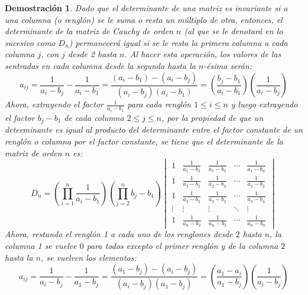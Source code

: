 \documentclass[a4paper,11pt]{article}
\theoremstyle{teoremas}
\theoremstyle{ejemplos}
\theoremstyle{definiciones}
\theoremstyle{lemas}
\newtheorem*{demostracion}{Demostraci\'on}
\begin{document}
\begin{demostracion}
 Dado que el determinante de una matriz es invariante si a una columna (o rengl\'on) se le suma o resta un m\'ultiplo de otra, entonces, el determinante de la matriz de Cauchy de orden $n$ (al que se le denotar\'a en lo sucesivo como $D_n$) permanecer\'a igual si se le resta la primera columna a cada columna $j$, con $j$ desde 2 hasta $n$. Al hacer esta operaci\'on, los valores de las sentradas en cada columna desde la segunda hasta la $n$-\'esima ser\'an:
 \begin{equation*}
  a_{ij} = \frac{1}{a_i-b_j} - \frac{1}{a_i - b_1} = \frac{(a_i - b_1) - (a_i - b_j)}{(a_i - b_j)(a_i - b_1)} = \left( \frac{b_j - b_1}{a_i - b_1} \right) \left( \frac{1}{a_i - b_j} \right)
 \end{equation*}
 Ahora, extrayendo el factor $\frac{1}{a_i - b_1}$ para cada rengl\'on $1\leq i \leq n$ y luego extrayendo el factor $b_j - b_1$ de cada columna $2 \leq j \leq n$, por la propiedad de que un determinante es igual al producto del determinante entre el factor constante de un rengl\'on o columna por el factor constante, se tiene que el determinante de la matriz de orden $n$ es:
 \begin{equation*}
  D_n = \left( \prod_{i=1}^{n} \frac{1}{a_i - b_1} \right) \left( \prod_{j=2}^n b_j - b_1 \right)
  \begin{vmatrix}
   1 & \displaystyle{\frac{1}{a_1 - b_2}} & \displaystyle{\frac{1}{a_1 - b_3}} & \cdots & \displaystyle{\frac{1}{a_1 - b_n}} \\ 
   1 & \displaystyle{\frac{1}{a_2 - b_2}} & \displaystyle{\frac{1}{a_2 - b_3}} & \cdots & \displaystyle{\frac{1}{a_2 - b_2}} \\ 
   1 & \displaystyle{\frac{1}{a_3 - b_2}} & \displaystyle{\frac{1}{a_3 - b_3}} & \cdots & \displaystyle{\frac{1}{a_3 - b_n}} \\
   \vdots & \vdots & \vdots & \ddots & \vdots \\
   1 & \displaystyle{\frac{1}{a_n - b_2}} & \displaystyle{\frac{1}{a_n - b_3}} & \cdots & \displaystyle{\frac{1}{a_n - b_n}}
  \end{vmatrix}
 \end{equation*}
 Ahora, restando el rengl\'on 1 a cada uno de los renglones desde $2$ hasta $n$, la columna 1 se vuelve $0$ para todos excepto el primer rengl\'on y de la columna $2$ hasta la $n$, se vuelven los elementos:
 \begin{equation*}
  a_{ij} = \frac{1}{a_i - b_j} - \frac{1}{a_1 - b_j} = \frac{(a_1 - b_j) - (a_i - b_j)}{(a_i - b_j)(a_1 - b_j)} = \left( \frac{a_1 - a_i}{a_1 - b_j} \right) \left( \frac{1}{a_i - b_j} \right)

\end{equation*}
\end{demostracion}
\end{document}
